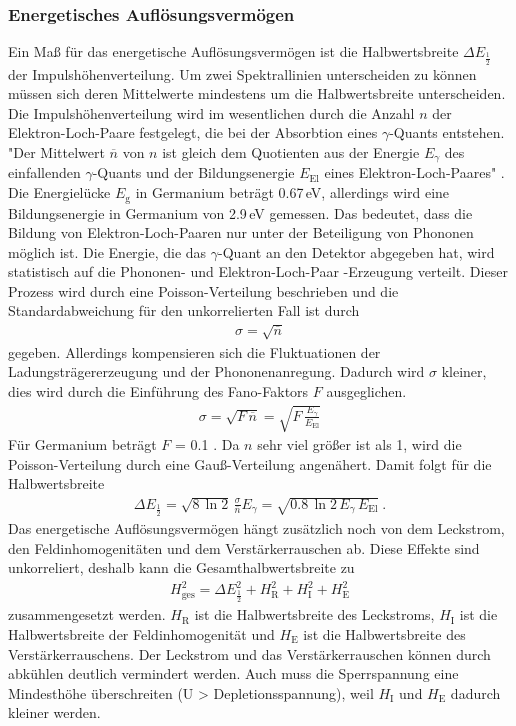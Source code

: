 \subsubsection{Energetisches Auflösungsvermögen}
\label{sec:EAuflösung}
Ein Maß für das energetische Auflösungsvermögen ist die Halbwertsbreite $\Delta E_\frac{1}{2}$ der Impulshöhenverteilung. Um zwei Spektrallinien unterscheiden zu können müssen sich deren Mittelwerte mindestens um die Halbwertsbreite unterscheiden. \\
Die Impulshöhenverteilung wird im wesentlichen durch die Anzahl $n$ der Elektron-Loch-Paare festgelegt, die bei der Absorbtion eines $\gamma$-Quants entstehen. "Der Mittelwert $\overline{n}$ von $n$ ist gleich dem Quotienten aus der Energie $E_\gamma$ des einfallenden $\gamma$-Quants und der Bildungsenergie $E_\text{El}$ eines Elektron-Loch-Paares" \cite[14]{V18}. Die Energielücke $E_\text{g}$ in Germanium beträgt 0.67\,eV, allerdings wird eine Bildungsenergie in Germanium von 2.9\,eV gemessen. Das bedeutet, dass die Bildung von Elektron-Loch-Paaren nur unter der Beteiligung von Phononen möglich ist. Die Energie, die das $\gamma$-Quant an den Detektor abgegeben hat, wird statistisch auf die Phononen- und Elektron-Loch-Paar -Erzeugung verteilt. Dieser Prozess wird durch eine Poisson-Verteilung beschrieben und die Standardabweichung für den unkorrelierten Fall ist durch
\begin{align}
	\sigma = \sqrt{\overline{n}}
\end{align}
gegeben. Allerdings kompensieren sich die Fluktuationen der Ladungsträgererzeugung und der Phononenanregung. Dadurch wird $\sigma$ kleiner, dies wird durch die Einführung des Fano-Faktors $F$ ausgeglichen.
\begin{align}
	\sigma = \sqrt{F\,\overline{n}} = \sqrt{F\,\frac{E_\gamma}{E_\text{El}}}
\end{align}
Für Germanium beträgt $F$ = 0.1 \cite[15]{V18}. Da $n$ sehr viel größer ist als 1, wird die Poisson-Verteilung durch eine Gauß-Verteilung angenähert. Damit folgt für die Halbwertsbreite
\begin{align}
	\Delta E_\frac{1}{2} = \sqrt{8\,\ln2} \, \frac{\sigma} {\overline{n}} E_\gamma = \sqrt{0.8\,\ln2\,E_\gamma \, E_\text{El}} \ .
\end{align}
Das energetische Auflösungsvermögen hängt zusätzlich noch von dem Leckstrom, den Feldinhomogenitäten und dem Verstärkerrauschen ab. Diese Effekte sind unkorreliert, deshalb kann die Gesamthalbwertsbreite zu
\begin{align}
	H_\text{ges}^2 = \Delta E_\frac{1}{2}^2 + H_\text{R}^2 + H_\text{I}^2 + H_\text{E}^2
\end{align}
zusammengesetzt werden. $H_\text{R}$ ist die Halbwertsbreite des Leckstroms, $H_\text{I}$ ist die Halbwertsbreite der Feldinhomogenität und $H_\text{E}$ ist die Halbwertsbreite des Verstärkerrauschens. Der Leckstrom und das Verstärkerrauschen können durch abkühlen deutlich vermindert werden. Auch muss die Sperrspannung eine Mindesthöhe überschreiten (U > Depletionsspannung), weil $H_\text{I}$ und $H_\text{E}$ dadurch kleiner werden.



